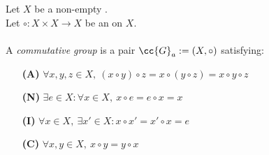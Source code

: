 \begin{definition}
    Let \(X\) be a non-empty .\\
    Let \(\circ: X\times X \to X\) be an  on \(X\). \\\\
    A \textit{commutative group} is a pair \(\cc{G}_a:= (X, \circ)\) satisfying:
    \begin{enumerate}
        \item [\textbf{(A)}] \(\forall x,y,z\in X,\ (x\circ y)\circ z= x\circ (y\circ z) = x\circ y \circ z\)
        \item [\textbf{(N)}] \(\exists e \in X : \forall x \in X,\ x\circ e = e \circ x = x\)
        \item [\textbf{(I)}] \(\forall x \in X,\ \exists x'\in X: x\circ x' = x'\circ x = e\)
        \item [\textbf{(C)}] \(\forall x,y\in X,\ x\circ y = y\circ x\)
    \end{enumerate}
\end{definition}

\begin{definition}[Semiring]
\end{definition}

\begin{definition}
\end{definition}

\begin{definition}[Ring]
\end{definition}

\begin{definition}[Field]
\end{definition}
\begin{definition}
\end{definition}

\begin{definition}
\end{definition}

\begin{definition}[Unit]
\end{definition}
\begin{definition}
\end{definition}

